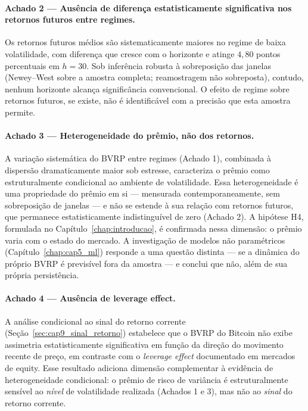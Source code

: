 \paragraph{Achado 2 --- Ausência de diferença estatisticamente
significativa nos retornos futuros entre regimes.} Os retornos futuros
médios são sistematicamente maiores no regime de baixa volatilidade, com
diferença que cresce com o horizonte e atinge $4{,}80$ pontos
percentuais em $h=30$. Sob inferência robusta à sobreposição das janelas
(Newey--West sobre a amostra completa; reamostragem não sobreposta),
contudo, nenhum horizonte alcança significância convencional. O efeito
de regime sobre retornos futuros, se existe, não é identificável com a
precisão que esta amostra permite.

\paragraph{Achado 3 --- Heterogeneidade do prêmio, não dos retornos.} A
variação sistemática do BVRP entre regimes (Achado 1), combinada à
dispersão dramaticamente maior sob estresse, caracteriza o prêmio como
estruturalmente condicional ao ambiente de volatilidade. Essa
heterogeneidade é uma propriedade do prêmio em si --- mensurada
contemporaneamente, sem sobreposição de janelas --- e não se estende à
sua relação com retornos futuros, que permanece estatisticamente
indistinguível de zero (Achado 2). A hipótese H4, formulada no
Capítulo~\ref{chap:introducao}, é confirmada nessa dimensão: o prêmio
varia com o estado do mercado. A investigação de modelos não
paramétricos (Capítulo~\ref{chap:cap5_ml}) responde a uma questão
distinta --- se a dinâmica do próprio BVRP é previsível fora da amostra
--- e conclui que não, além de sua própria persistência.


\paragraph{Achado 4 --- Ausência de leverage effect.} A análise condicional ao sinal do retorno corrente (Seção~\ref{sec:cap9_sinal_retorno}) estabelece que o BVRP do Bitcoin não exibe assimetria estatisticamente significativa em função da direção do movimento recente de preço, em contraste com o \textit{leverage effect} documentado em mercados de equity. Esse resultado adiciona dimensão complementar à evidência de heterogeneidade condicional: o prêmio de risco de variância é estruturalmente sensível ao \textit{nível} de volatilidade realizada (Achados 1 e 3), mas não ao \textit{sinal} do retorno corrente.

